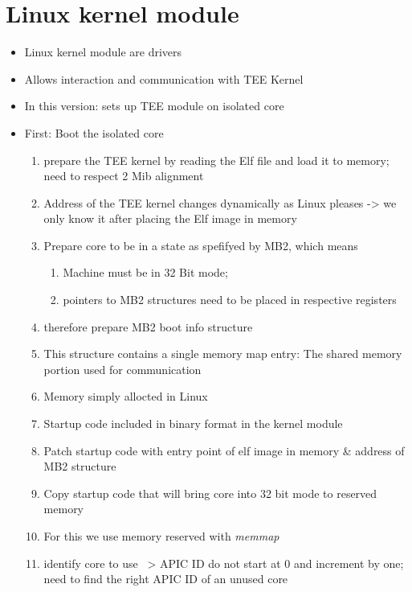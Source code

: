\section{Linux kernel module}
\begin{itemize}
    \item Linux kernel module are drivers
    \item Allows interaction and communication with TEE Kernel
    \item In this version: sets up TEE module on isolated core
    \item First: Boot the isolated core
          \begin{enumerate}
              \item prepare the TEE kernel by reading the Elf file and load it to
                    memory; need to respect 2 Mib alignment
              \item Address of the TEE kernel changes dynamically as Linux pleases
                    -> we only know it after placing the Elf image in memory
              \item Prepare core to be in a state as spefifyed by MB2, which means
                    \begin{enumerate}
                        \item Machine must be in 32 Bit mode;
                        \item pointers to MB2 structures need to be placed in respective registers
                    \end{enumerate}
              \item therefore prepare MB2 boot info structure
              \item This structure contains a single memory map entry: The shared memory portion used for communication
              \item Memory simply allocted in Linux
              \item Startup code included in binary format in the kernel module
              \item Patch startup code with entry point of elf image in memory \& address of MB2 structure
              \item Copy startup code that will bring core into 32 bit mode to reserved memory
              \item For this we use memory reserved with \textit{memmap}
              \item identify core to use ~> APIC ID do not start at 0 and
                    increment by one; need to find the right APIC ID of an unused core

\end{enumerate}
\end{itemize}
